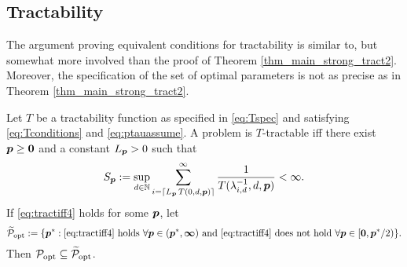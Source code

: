 \documentclass[11pt,a4paper]{article}
\begin{document}
\subsection{Tractability} \label{sec:tractability}


The argument proving equivalent conditions for tractability is similar to, but somewhat more involved than the proof of Theorem \ref{thm_main_strong_tract2}.  Moreover, the specification of the set of optimal parameters is not as precise as in Theorem \ref{thm_main_strong_tract2}.

\begin{theorem}\label{thm_main_tract2}
Let $T$ be a tractability function as specified in \eqref{eq:Tspec} and satisfying \eqref{eq:Tconditions} and \eqref{eq:ptauassume}.  A problem is $T$-tractable iff there exist $\boldsymbol{p}\ge \boldsymbol{0}$ and a constant $L_{\boldsymbol{p}} > 0$ such that
\begin{equation} \label{eq:tractiff4}
     S_{\boldsymbol{p}}:=\sup_{d \in \mathbb{N}}
     \sum_{i = \lceil L_{\boldsymbol{p}}\, T(0,d,\boldsymbol{p}) \rceil}^\infty \frac{1}{T(\lambda^{-1}_{i,d},d,\boldsymbol{p})}< \infty.
\end{equation}
If \eqref{eq:tractiff4} holds for some $\boldsymbol{p}$, let  
\[
\widetilde{\mathcal{P}}_{\textup{opt}} : = \{\boldsymbol{p}^* : \eqref{eq:tractiff4} \text{ holds }\forall \boldsymbol{p} \in (\boldsymbol{p}^*,\boldsymbol{\infty}) \text{ and }  \eqref{eq:tractiff4} \text{ does not hold } \forall \boldsymbol{p} \in [\boldsymbol{0},\boldsymbol{p}^*/2)\}.
\]
Then $\mathcal{P}_{\textup{opt}} \subseteq \widetilde{\mathcal{P}}_{\textup{opt}}$.
\
\end{theorem}
\end{document}
